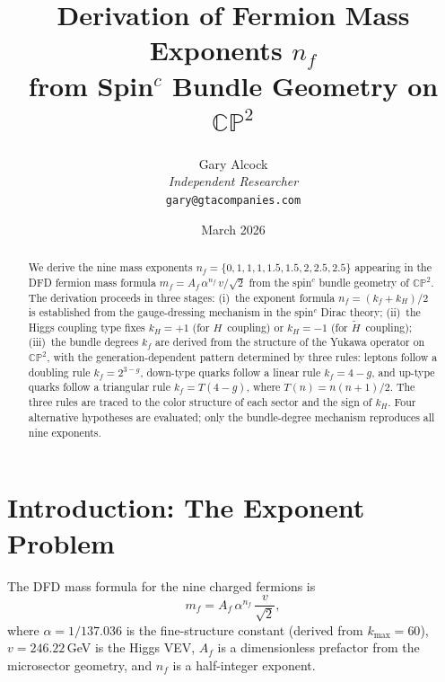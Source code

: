 \documentclass[11pt,a4paper]{article}
\newcommand{\CP}{\mathbb{CP}}
\theoremstyle{definition}
\theoremstyle{remark}
\begin{document}
\title{Derivation of Fermion Mass Exponents $n_f$\\
from Spin$^c$ Bundle Geometry on $\CP^2$}

\author{Gary Alcock\\
\textit{Independent Researcher}\\
\texttt{gary@gtacompanies.com}}

\date{March 2026}

\maketitle

\begin{abstract}
We derive the nine mass exponents $n_f = \{0, 1, 1, 1, 1.5, 1.5, 2, 2.5, 2.5\}$
appearing in the DFD fermion mass formula $m_f = A_f\,\alpha^{n_f}\,v/\sqrt{2}$
from the spin$^c$ bundle geometry of $\CP^2$.  The derivation proceeds in three
stages: (i)~the exponent formula $n_f = (k_f + k_H)/2$ is established from the
gauge-dressing mechanism in the spin$^c$ Dirac theory; (ii)~the Higgs coupling
type fixes $k_H = +1$ (for $H$~coupling) or $k_H = -1$ (for $\tilde{H}$~coupling);
(iii)~the bundle degrees $k_f$ are derived from the structure of the Yukawa operator
on $\CP^2$, with the generation-dependent pattern determined by three rules:
leptons follow a doubling rule $k_f = 2^{3-g}$, down-type quarks follow a
linear rule $k_f = 4-g$, and up-type quarks follow a triangular rule
$k_f = T(4-g)$, where $T(n) = n(n+1)/2$.  The three rules are traced to the
color structure of each sector and the sign of $k_H$.  Four alternative hypotheses
are evaluated; only the bundle-degree mechanism reproduces all nine exponents.
\end{abstract}

\tableofcontents

\section{Introduction: The Exponent Problem}
\label{sec:intro}

The DFD mass formula for the nine charged fermions is
\begin{equation}\label{eq:master}
m_f = A_f\,\alpha^{n_f}\,\frac{v}{\sqrt{2}},
\end{equation}
where $\alpha = 1/137.036$ is the fine-structure constant (derived from
$k_{\max}=60$), $v = 246.22$\,GeV is the Higgs VEV, $A_f$ is a
dimensionless prefactor from the microsector geometry, and $n_f$ is a
half-integer exponent.
\end{document}
